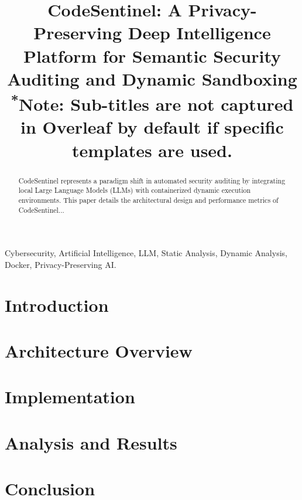 \documentclass[conference]{IEEEtran}
\begin{document}
\title{CodeSentinel: A Privacy-Preserving Deep Intelligence Platform for Semantic Security Auditing and Dynamic Sandboxing\\
{\footnotesize \textsuperscript{*}Note: Sub-titles are not captured in Overleaf by default if specific templates are used.}
}

\author{
}

\maketitle

\begin{abstract}
CodeSentinel represents a paradigm shift in automated security auditing by integrating local Large Language Models (LLMs) with containerized dynamic execution environments. This paper details the architectural design and performance metrics of CodeSentinel...
\end{abstract}

\begin{IEEEkeywords}
Cybersecurity, Artificial Intelligence, LLM, Static Analysis, Dynamic Analysis, Docker, Privacy-Preserving AI.
\end{IEEEkeywords}

\section{Introduction}

\section{Architecture Overview}

\section{Implementation}

\section{Analysis and Results}

\section{Conclusion}



\end{document}

